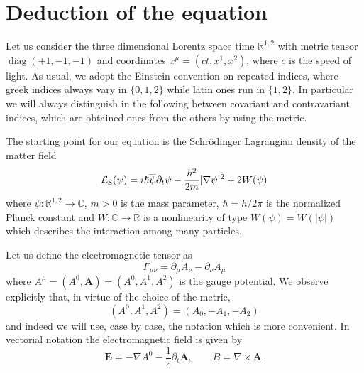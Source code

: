 \documentclass[11pt,leqno,twoside,reqno]{amsart}
\numberwithin{equation}{section}
\begin{document}
\section{Deduction of the equation}\label{se:deduction}

Let us consider the  three dimensional Lorentz space time $\mathbb R^{1,2}$ with metric tensor $\operatorname{diag}(+1,-1,-1)$
and coordinates $x^{\mu}=(ct,x^{1},x^{2})$, where $c$ is the  speed of light.
As usual, we adopt the Einstein convention on repeated indices, where greek indices always vary in $\{0,1,2\}$ while latin ones run in $\{1,2\}$.
In particular we will always distinguish in the following
between covariant and contravariant indices, which are obtained
ones from the others by using the metric.

The starting point for our equation is the Schr\"odinger Lagrangian density of the matter field
\begin{equation}
\label{LS}
\mathcal{L}_{\rm S}(\psi)= i \hbar \overline \psi  \partial_t\psi -\frac{\hbar^{2}}{2m} |\nabla \psi|^{2}+2W(\psi)
\end{equation}
where $\psi:\mathbb{R}^{1,2}\to\mathbb{C}$, $m>0$ is the mass parameter, $\hbar=h/2\pi$ is the normalized Planck constant and 
$W:\mathbb C\to \mathbb R$ is a  nonlinearity of type $W(\psi)=W(|\psi|)$ which describes the interaction among many particles. 

Let us define the electromagnetic tensor as
\[
F_{\mu\nu}=\partial_{\mu} A_{\nu}-\partial_{\nu}A_{\mu}
\]
where $A^{\mu}=(A^{0},\mathbf A)=(A^0,A^1,A^2)$ is the gauge potential.
We observe explicitly that, in virtue of the choice of the metric,
\begin{equation}\label{eq:cov-controv}
(A^{0}, A^{1},A^{2})=(A_{0},-A_{1},-A_{2})
\end{equation}
and indeed we will use, case by case, the notation which is more convenient.
In vectorial notation the electromagnetic field is given by
\begin{equation}
\label{EB}
\mathbf E=-\nabla A^{0}-\frac{1}{c}\partial_{t}\mathbf A, \qquad B= \nabla \times  \mathbf A.
\end{equation}
\end{document}
